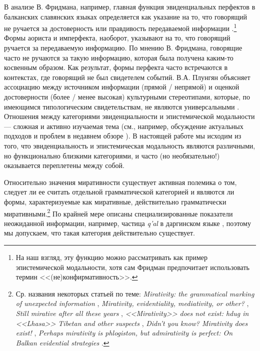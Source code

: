 \par В анализе В. Фридмана, например, главная функция эвиденциальных перфектов в балканских славянских языках определяется как указание на то, что говорящий не ручается за достоверность или правдивость передаваемой информации \citep[185--186]{friedman1986}.\footnote{На наш взгляд, эту функцию можно рассматривать как пример эпистемической модальности, хотя сам Фридман предпочитает использовать термин <<(не)конфирмативность>>.} Формы аориста и имперфекта, наоборот, указывают на то, что говорящий ручается за передаваемую информацию. По мнению В. Фридмана, говорящие часто не ручаются за такую информацию, которая была получена каким-то косвенным образом. Как результат, формы перфекта часто встречаются в контекстах, где говорящий не был свидетелем событий. В.А. Плунгян объясняет ассоциацию между источником информации (прямой / непрямой) и оценкой достоверности (более / менее высокая) культурными стереотипами, которые, по имеющимся типологическим свидетельствам, не являются универсальными \citep[354]{plungian2001}. Отношения между категориями эвиденциальности и эпистемической модальности --- сложная и активно изучаемая тема (см., например, обсуждение актуальных подходов и проблем в недавнем обзоре \citep{wiemer2018}). В настоящей работе мы исходим из того, что эвиденциальность и эпистемическая модальность являются различными, но функционально близкими категориями, и часто (но необязательно!) оказывается переплетены между собой.
\par Относительно значения миративности существует активная полемика о том, следует ли ее считать отдельной грамматической категорией и являются ли формы, характеризуемые как миративные, действительно грамматически миративными.\footnote{Ср. названия некоторых статьей по теме: \textit{Mirativity: the grammatical marking of unexpected information} \citep{delancey1997}, \textit{Mirativity, evidentiality, mediativity, or other?} \citep{lazard1999}, \textit{Still mirative after all these years} \citep{delancey2012}, \textit{<<Mirativity>> does not exist: hdug in <<Lhasa>> Tibetan and other suspects} \citep{hill2012}, \textit{Didn’t you know? Mirativity does exist!} \citep{hengeveldolbertz2012}, \textit{Perhaps mirativity is phlogiston, but admirativity is perfect: On Balkan evidential strategies} \citep{friedman2014}.} По крайней мере описаны специализированные показатели неожиданной информации, например, частица \textit{q’al} в даргинском языке \citep[453--454]{tatevosov2001}, поэтому мы допускаем, что такая категория действительно существует.


